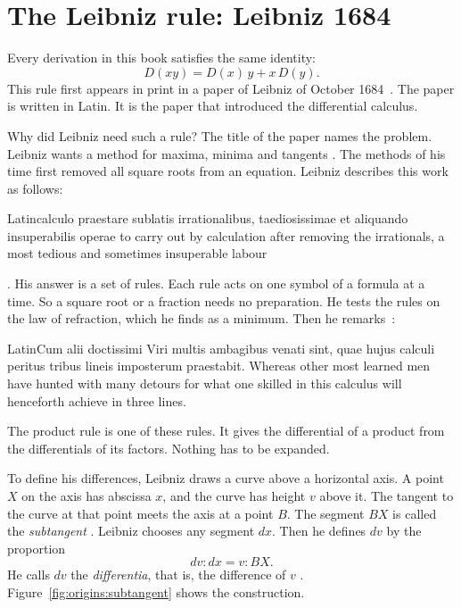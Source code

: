 \section[The Leibniz rule: Leibniz 1684][The Leibniz rule]{The Leibniz rule: Leibniz 1684}\label{sec:origins:leibniz-rule}

Every derivation in this book satisfies the same identity:
\[
  D(xy) = D(x)\,y + x\,D(y).
\]
This rule first appears in print in a paper of Leibniz of October
1684~\cite{Leibniz1684}. The paper is written in Latin. It is the paper that
introduced the differential calculus.

Why did Leibniz need such a rule? The title of the paper names the problem. Leibniz wants a method for maxima,
minima and tangents . The
methods of his time first removed all square roots from an equation. Leibniz
describes this work as follows:
\begin{originalquote}{Latin}{calculo praestare sublatis irrationalibus, taediosissimae et aliquando insuperabilis operae}
to carry out by calculation after removing the irrationals, a most tedious
and sometimes insuperable labour
\end{originalquote}
\noindent\cite[p.~472]{Leibniz1684}. His answer is a set of rules. Each rule
acts on one symbol of a formula at a time. So a square root or a fraction
needs no preparation. He tests the rules on the law of refraction, which he
finds as a minimum. Then he remarks~\cite[p.~472]{Leibniz1684}:
\begin{originalquote}{Latin}{Cum alii doctissimi Viri multis ambagibus venati sint, quae hujus calculi peritus tribus lineis imposterum praestabit.}
Whereas other most learned men have hunted with many detours for what one
skilled in this calculus will henceforth achieve in three lines.
\end{originalquote}
\noindent The product rule is one of these rules. It gives the differential of
a product from the differentials of its factors. Nothing has to be expanded.

To define his differences, Leibniz draws a curve above a horizontal axis. A point $X$ on the axis has
abscissa $x$, and the curve has height $v$ above it. The tangent to the curve
at that point meets the axis at a point $B$. The segment $BX$ is called the
\emph{subtangent} \cite[p.~467]{Leibniz1684}. Leibniz chooses any segment $dx$. Then he defines $dv$ by
the proportion
\[
  dv : dx = v : BX .
\]
He calls $dv$ the \emph{differentia}, that is, the difference of $v$ \cite[p.~467]{Leibniz1684}.
Figure~\ref{fig:origins:subtangent} shows the construction.

